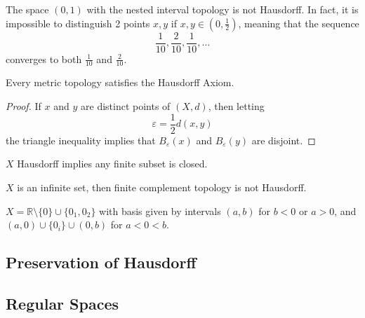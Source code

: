   \begin{example}
    The space $(0,1)$ with the nested interval topology is not Hausdorff. In fact, it is impossible to distinguish 2 points $x, y$ if $x, y \in (0, \frac{1}{2})$, meaning that the sequence
    \begin{equation}
        \frac{1}{10}, \frac{2}{10}, \frac{1}{10}, \ldots
    \end{equation}
    converges to both $\frac{1}{10}$ and $\frac{2}{10}$.
  \end{example} 

  \begin{theorem}
    Every metric topology satisfies the Hausdorff Axiom.
  \end{theorem}
  \begin{proof}
    If $x$ and $y$ are distinct points of $(X, d)$, then letting
    \begin{equation}
      \varepsilon = \frac{1}{2} d(x, y)
    \end{equation}
    the triangle inequality implies that $B_\varepsilon (x)$ and $B_\varepsilon (y)$ are disjoint. 
  \end{proof}

  \begin{lemma} 
    $X$ Hausdorff implies any finite subset is closed. 
  \end{lemma}

  \begin{example}
    $X$ is an infinite set, then finite complement topology is not Hausdorff. 
  \end{example} 

  \begin{example}
    $X = \mathbb{R} \setminus \{0\} \cup \{0_1, 0_2\}$ with basis given by intervals $(a, b)$ for $b < 0$ or $a > 0$, and $(a, 0) \cup \{0_i\} \cup (0, b)$ for $a < 0 < b$. 
  \end{example}

\subsection{Preservation of Hausdorff}

\subsection{Regular Spaces}

